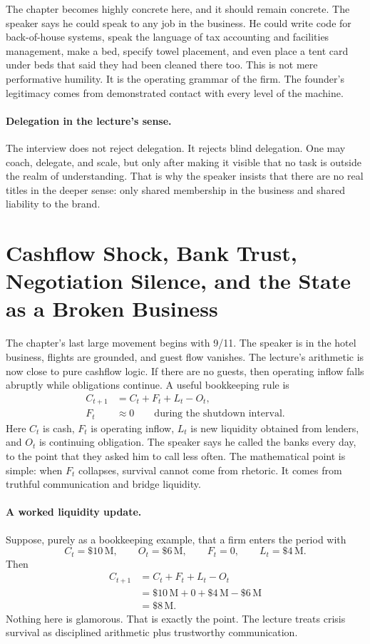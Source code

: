 The chapter becomes highly concrete here, and it should remain concrete. The speaker says he could speak to any job in the business. He could write code for back-of-house systems, speak the language of tax accounting and facilities management, make a bed, specify towel placement, and even place a tent card under beds that said they had been cleaned there too. This is not mere performative humility. It is the operating grammar of the firm. The founder's legitimacy comes from demonstrated contact with every level of the machine.

\paragraph{Delegation in the lecture's sense.}
The interview does not reject delegation. It rejects blind delegation. One may coach, delegate, and scale, but only after making it visible that no task is outside the realm of understanding. That is why the speaker insists that there are no real titles in the deeper sense: only shared membership in the business and shared liability to the brand.

\section{Cashflow Shock, Bank Trust, Negotiation Silence, and the State as a Broken Business}

The chapter's last large movement begins with 9/11. The speaker is in the hotel business, flights are grounded, and guest flow vanishes. The lecture's arithmetic is now close to pure cashflow logic. If there are no guests, then operating inflow falls abruptly while obligations continue. A useful bookkeeping rule is
\begin{align}
C_{t+1} &= C_t + F_t + L_t - O_t,\\
F_t &\approx 0 \qquad \text{during the shutdown interval.}
\end{align}
Here \(C_t\) is cash, \(F_t\) is operating inflow, \(L_t\) is new liquidity obtained from lenders, and \(O_t\) is continuing obligation. The speaker says he called the banks every day, to the point that they asked him to call less often. The mathematical point is simple: when \(F_t\) collapses, survival cannot come from rhetoric. It comes from truthful communication and bridge liquidity.

\paragraph{A worked liquidity update.}
Suppose, purely as a bookkeeping example, that a firm enters the period with
\[
C_t=\$10\,\mathrm{M},\qquad O_t=\$6\,\mathrm{M},\qquad F_t=0,\qquad L_t=\$4\,\mathrm{M}.
\]
Then
\begin{align}
C_{t+1} &= C_t + F_t + L_t - O_t\\
&= \$10\,\mathrm{M}+0+\$4\,\mathrm{M}-\$6\,\mathrm{M}\\
&= \$8\,\mathrm{M}.
\end{align}
Nothing here is glamorous. That is exactly the point. The lecture treats crisis survival as disciplined arithmetic plus trustworthy communication.

